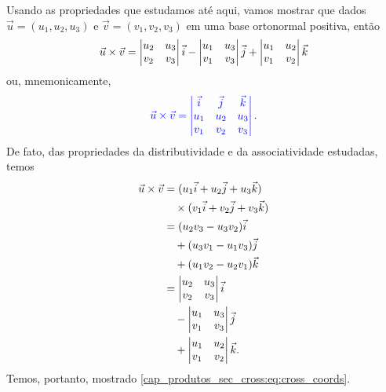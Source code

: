 Usando as propriedades que estudamos até aqui, vamos mostrar que dados $\vec{u} = (u_1,u_2,u_3)$ e $\vec{v} = (v_1,v_2,v_3)$ em uma base ortonormal positiva, então
\begin{equation}
  \vec{u}\times\vec{v} =
  \begin{vmatrix}
    u_2 & u_3\\
    v_2 & v_3
  \end{vmatrix}\vec{i} -
  \begin{vmatrix}
    u_1 & u_3\\
    v_1 & v_3
  \end{vmatrix}\vec{j} +
  \begin{vmatrix}
    u_1 & u_2 \\
    v_1 & v_2
  \end{vmatrix}\vec{k}
\end{equation}
ou, mnemonicamente,
\begin{equation}\label{cap_produtos_sec_cross:eq:cross_coords}\color{blue}\vec{u}\times\vec{v} =
  \begin{vmatrix}
    \vec{i} & \vec{j} & \vec{k} \\
    u_1 & u_2 & u_3 \\
    v_1 & v_2 & v_3
  \end{vmatrix}.
\end{equation}
De fato, das propriedades da distributividade e da associatividade estudadas, temos
\begin{align}
  \vec{u}\times\vec{v} &= (u_1\vec{i}+u_2\vec{j}+u_3\vec{k})\\
  &\quad \times(v_1\vec{i}+v_2\vec{j}+v_3\vec{k})\\
  &= (u_2v_3-u_3v_2)\vec{i}\\
  &\quad + (u_3v_1-u_1v_3)\vec{j}\\
  &\quad + (u_1v_2-u_2v_1)\vec{k}\\
  &= \begin{vmatrix}
    u_2 & u_3\\
    v_2 & v_3
  \end{vmatrix}\vec{i}\\
  &\quad -
  \begin{vmatrix}
    u_1 & u_3\\
    v_1 & v_3
  \end{vmatrix}\vec{j}\\
  &\quad +
  \begin{vmatrix}
    u_1 & u_2 \\
    v_1 & v_2
  \end{vmatrix}\vec{k}.
\end{align}
Temos, portanto, mostrado \eqref{cap_produtos_sec_cross:eq:cross_coords}.


